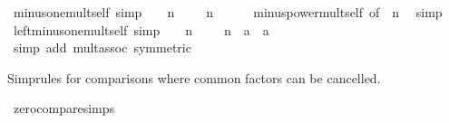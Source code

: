 \begin{isabellebody}
\endisatagproof
{\isafoldproof}%
%
\isadelimproof
\isanewline
%
\endisadelimproof
\isanewline
{}\isamarkupfalse%
\ minus{\isacharunderscore}{\kern0pt}one{\isacharunderscore}{\kern0pt}mult{\isacharunderscore}{\kern0pt}self\ {\isacharbrackleft}{\kern0pt}simp{\isacharbrackright}{\kern0pt}{\isacharcolon}{\kern0pt}\ {\isachardoublequoteopen}{\isacharparenleft}{\kern0pt}{\isacharminus}{\kern0pt}\ {}{\isacharparenright}{\kern0pt}\ {\isacharcircum}{\kern0pt}\ n\ {\isacharasterisk}{\kern0pt}\ {\isacharparenleft}{\kern0pt}{\isacharminus}{\kern0pt}\ {}{\isacharparenright}{\kern0pt}\ {\isacharcircum}{\kern0pt}\ n\ {\isacharequal}{\kern0pt}\ {}{\isachardoublequoteclose}\isanewline
%
\isadelimproof
\ \ %
\endisadelimproof
%
\isatagproof
{}\isamarkupfalse%
\ minus{\isacharunderscore}{\kern0pt}power{\isacharunderscore}{\kern0pt}mult{\isacharunderscore}{\kern0pt}self\ {\isacharbrackleft}{\kern0pt}of\ {}\ n{\isacharbrackright}{\kern0pt}\ \isamarkupfalse%
\ simp%
\endisatagproof
{\isafoldproof}%
%
\isadelimproof
\isanewline
%
\endisadelimproof
\isanewline
{}\isamarkupfalse%
\ left{\isacharunderscore}{\kern0pt}minus{\isacharunderscore}{\kern0pt}one{\isacharunderscore}{\kern0pt}mult{\isacharunderscore}{\kern0pt}self\ {\isacharbrackleft}{\kern0pt}simp{\isacharbrackright}{\kern0pt}{\isacharcolon}{\kern0pt}\ {\isachardoublequoteopen}{\isacharparenleft}{\kern0pt}{\isacharminus}{\kern0pt}\ {}{\isacharparenright}{\kern0pt}\ {\isacharcircum}{\kern0pt}\ n\ {\isacharasterisk}{\kern0pt}\ {\isacharparenleft}{\kern0pt}{\isacharparenleft}{\kern0pt}{\isacharminus}{\kern0pt}\ {}{\isacharparenright}{\kern0pt}\ {\isacharcircum}{\kern0pt}\ n\ {\isacharasterisk}{\kern0pt}\ a{\isacharparenright}{\kern0pt}\ {\isacharequal}{\kern0pt}\ a{\isachardoublequoteclose}\isanewline
%
\isadelimproof
\ \ %
\endisadelimproof
%
\isatagproof
{}\isamarkupfalse%
\ {\isacharparenleft}{\kern0pt}simp\ add{\isacharcolon}{\kern0pt}\ mult{\isachardot}{\kern0pt}assoc\ {\isacharbrackleft}{\kern0pt}symmetric{\isacharbrackright}{\kern0pt}{\isacharparenright}{\kern0pt}%
\endisatagproof
{\isafoldproof}%
%
\isadelimproof
\isanewline
%
\endisadelimproof
\isanewline
{}\isamarkupfalse%
%
\begin{isamarkuptext}%
Simprules for comparisons where common factors can be cancelled.%
\end{isamarkuptext}\isamarkuptrue%
\isamarkupfalse%
\ zero{\isacharunderscore}{\kern0pt}compare{\isacharunderscore}{\kern0pt}simps\ {\isacharequal}{\kern0pt}\isanewline

\end{isabellebody}
